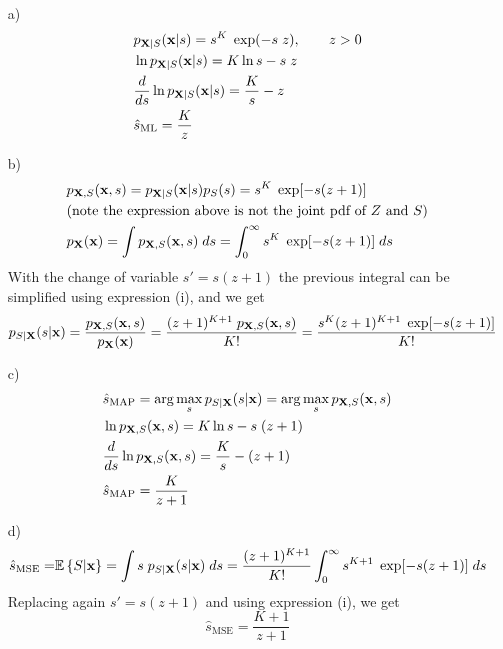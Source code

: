 \begin{solution}
~
\begin{itemize}
    \item[a)] 
    \begin{align}
    & p_{{\bf X}|S}({\bf x}|s) = s^K \; \exp(-s\; z), \qquad z>0 \nonumber\\
    & \ln{p_{{\bf X}|S}({\bf x}|s)} = K \ln{s} - s\; z \nonumber\\ 
    & \frac{d}{ds} \ln{p_{{\bf X}|S}({\bf x}|s)} = \frac{K}{s} - z \nonumber\\
    & {\hat s}_\text{ML} = \frac{K}{z} \nonumber
    \end{align}

    \item[b)]
    \begin{align}
        & p_{{\bf X},S}({\bf x},s) = p_{{\bf X}|S}({\bf x}|s) p_S(s) = s^K \; \exp[-s(z+1)] \nonumber \\
        & \text{(note the expression above is not the joint pdf of $Z$ and $S$)} \nonumber \\
        & p_{\bf X}({\bf x}) = \int p_{{\bf X},S}({\bf x},s)\; ds = \int_0^\infty s^K \; \exp[-s(z+1)]\;ds \nonumber
    \end{align}
    With the change of variable $s' = s(z+1)$ the previous integral can be simplified using expression (i), and we get
    \begin{align}
        & p_{S|{\bf X}}(s|{\bf x}) = \displaystyle\frac{p_{{\bf X},S}({\bf x},s)}{p_{\bf X}({\bf x})} = \displaystyle\frac{(z+1)^{K+1}\;p_{{\bf X},S}({\bf x},s)}{K !} = \displaystyle\frac{s^K(z+1)^{K+1}\; \exp[-s(z+1)]}{K !} \nonumber
    \end{align}

    \item[c)]
    \begin{align}
        & {\hat s}_\text{MAP} = \arg\max_s p_{S|{\bf X}}(s|{\bf x}) = \arg\max_s p_{{\bf X},S}({\bf x},s) \nonumber \\
        & \ln{p_{{\bf X},S}({\bf x},s)} = K \ln{s} - s\;(z+1) \nonumber \\
        & \frac{d}{ds} \ln{p_{{\bf X},S}({\bf x},s)} = \frac{K}{s} - (z+1) \nonumber\\
    & {\hat s}_\text{MAP} = \frac{K}{z+1} \nonumber
    \end{align}
    
    \item[d)]
    \begin{align}
        \hat{s}_\text{MSE} = & \mathbb{E}\left\{ S | {\bf x}\right\} = \int s\; p_{S|{\bf X}}(s|{\bf x})\; ds = \displaystyle\frac{(z+1)^{K+1}}{K!} \int_{0}^{\infty} s^{K+1} \; \exp[-s(z+1)]\; ds \nonumber
    \end{align}
    Replacing again $s' = s(z+1)$ and using expression (i), we get $$\hat{s}_\text{MSE} = \frac{K+1}{z+1}$$
    

\end{itemize}
\end{solution}
